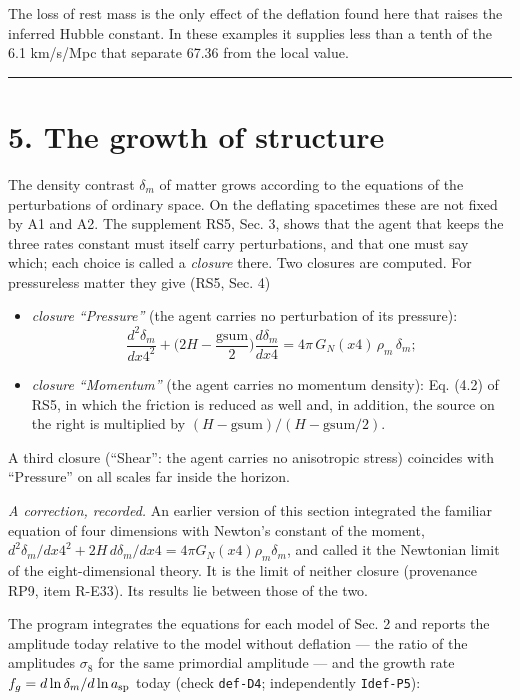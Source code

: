 \documentclass[
  10pt,
]{article}
\providecommand{\tightlist}{%
  \setlength{\itemsep}{0pt}\setlength{\parskip}{0pt}}
\begin{document}
The loss of rest mass is the only effect of the deflation found here
that raises the inferred Hubble constant. In these examples it supplies
less than a tenth of the 6.1 km/s/Mpc that separate 67.36 from the local
value.

\begin{center}\rule{0.5\linewidth}{0.5pt}\end{center}

\hypertarget{the-growth-of-structure}{%
\section{5. The growth of structure}\label{the-growth-of-structure}}

The density contrast \(\delta_m\) of matter grows according to the
equations of the perturbations of ordinary space. On the deflating
spacetimes these are not fixed by A1 and A2. The supplement RS5, Sec. 3,
shows that the agent that keeps the three rates constant must itself
carry perturbations, and that one must say which; each choice is called
a \emph{closure} there. Two closures are computed. For pressureless
matter they give (RS5, Sec. 4)

\begin{itemize}
\tightlist
\item
  \emph{closure ``Pressure''} (the agent carries no perturbation of its
  pressure):
  \[\frac{d^2\delta_m}{dx4^2}+\Big(2H-\frac{\mathrm{gsum}}{2}\Big)\frac{d\delta_m}{dx4}=4\pi\,G_N(x4)\,\rho_m\,\delta_m ;\]
\item
  \emph{closure ``Momentum''} (the agent carries no momentum density):
  Eq. (4.2) of RS5, in which the friction is reduced as well and, in
  addition, the source on the right is multiplied by
  \((H-\mathrm{gsum})/(H-\mathrm{gsum}/2)\).
\end{itemize}

A third closure (``Shear'': the agent carries no anisotropic stress)
coincides with ``Pressure'' on all scales far inside the horizon.

\emph{A correction, recorded.} An earlier version of this section
integrated the familiar equation of four dimensions with Newton's
constant of the moment,
\(d^2\delta_m/dx4^2+2H\,d\delta_m/dx4=4\pi G_N(x4)\rho_m\delta_m\), and
called it the Newtonian limit of the eight-dimensional theory. It is the
limit of neither closure (provenance RP9, item R-E33). Its results lie
between those of the two.

The program integrates the equations for each model of Sec. 2 and
reports the amplitude today relative to the model without deflation ---
the ratio of the amplitudes \(\sigma_8\) for the same primordial
amplitude --- and the growth rate \(f_g=d\ln\delta_m/d\ln a_{\rm sp}\)
today (check \texttt{def-D4}; independently \texttt{Idef-P5}):
\end{document}
